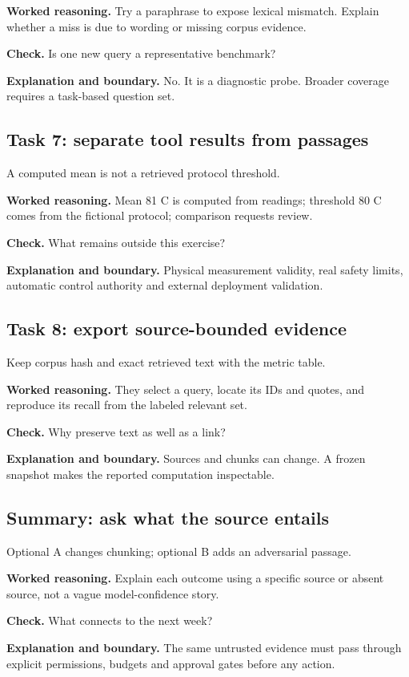 \textbf{Worked reasoning.} Try a paraphrase to expose lexical mismatch. Explain whether a miss is due to wording or missing corpus evidence.

\textbf{Check.} Is one new query a representative benchmark?

\textbf{Explanation and boundary.} No. It is a diagnostic probe. Broader coverage requires a task-based question set.

\subsection{Task 7: separate tool results from passages}
A computed mean is not a retrieved protocol threshold.

\textbf{Worked reasoning.} Mean 81 C is computed from readings; threshold 80 C comes from the fictional protocol; comparison requests review.

\textbf{Check.} What remains outside this exercise?

\textbf{Explanation and boundary.} Physical measurement validity, real safety limits, automatic control authority and external deployment validation.

\subsection{Task 8: export source-bounded evidence}
Keep corpus hash and exact retrieved text with the metric table.

\textbf{Worked reasoning.} They select a query, locate its IDs and quotes, and reproduce its recall from the labeled relevant set.

\textbf{Check.} Why preserve text as well as a link?

\textbf{Explanation and boundary.} Sources and chunks can change. A frozen snapshot makes the reported computation inspectable.

\subsection{Summary: ask what the source entails}
Optional A changes chunking; optional B adds an adversarial passage.

\textbf{Worked reasoning.} Explain each outcome using a specific source or absent source, not a vague model-confidence story.

\textbf{Check.} What connects to the next week?

\textbf{Explanation and boundary.} The same untrusted evidence must pass through explicit permissions, budgets and approval gates before any action.

